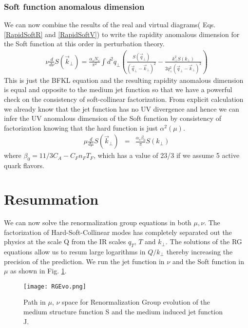 \documentclass[letter,11pt]{article}
\newcommand{\bea}{\begin{eqnarray}}
\newcommand{\eea}{\end{eqnarray}}
\begin{document}
\subsubsection{Soft function anomalous dimension}
We can now combine the results of the real and virtual diagrams( Eqs. \ref{RapidSoftR} and \ref{RapidSoftV}) to write the rapidity anomalous dimension for the Soft function at this order in perturbation theory.
 \bea
\nu\frac{d}{d\nu} S(\vec{k}_{\perp})= \frac{\alpha_sN_c}{\pi^2}\int d^2q_{\perp} \left( \frac{S(\vec{q}_{\perp})}{(\vec{q}_{\perp}-\vec{k}_{\perp})^2} -\frac{k_{\perp}^2S(k_{\perp})}{2q_{\perp}^2(\vec{q}_{\perp}-\vec{k}_{\perp})^2}\right)
\eea
This is just the BFKL equation and the resulting rapidity anomalous dimension is equal and opposite to the medium jet function so that we have a powerful check on the consistency of soft-collinear factorization.
From explicit calculation we already know that the jet function has no UV divergence and hence we can infer the UV anomalous dimension of the Soft function by consistency of factorization knowing that the hard function is just $\alpha^2(\mu)$.
\bea
 \mu\frac{d}{d\mu} S(\vec{k}_{\perp})&=& \frac{\alpha_s\beta_0}{\pi}S(k_{\perp})
\eea
where $\beta_0 = 11/3 C_A - C_Fn_FT_F$, which has a value of 23/3 if we assume 5 active quark flavors.

\section{Resummation}
\label{sec:Resum}
We can now solve the renormalization group equations in both $\mu, \nu$. The factorization of Hard-Soft-Collinear modes has completely separated out the physics at the scale Q from the IR scales $q_T$, $T$ and $k_{\perp}$. The solutions of the RG equations allow us to resum large logarithms in $Q/k_{\perp}$ thereby increasing the precision of the prediction. We run the jet function in $\nu$ and the Soft function in $\mu$ as shown in Fig. \ref{RGE}.

\begin{figure}
\centering
  \texttt{[image: RGEvo.png]}
  \caption{Path in $\mu$, $\nu$ space for Renormalization Group evolution of the medium structure function S and the medium induced jet function J.}
  \label{RGE}
\end{figure}
\end{document}
